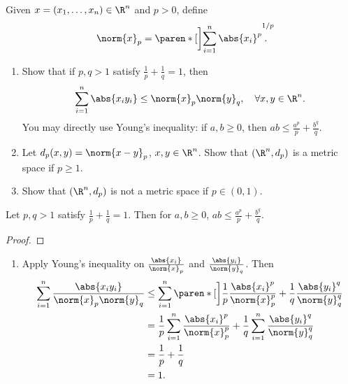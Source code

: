 \documentclass[12pt]{article}
\begin{document}
\begin{problem*}
    Given $x = (x_1, \dots, x_n) \in \R^n$ and $p > 0$, define \[
        \norm{x}_p = \paren*[\bigg]{\sum_{i=1}^{n} \abs{x_i}^p}^{1/p}
        \mkern-18mu.
    \]
    \begin{enumerate}[label=(\alph*)]
        \item Show that if $p, q > 1$ satisfy $\frac1p + \frac1q = 1$, then
        \[
            \sum_{i=1}^{n} \abs{x_i y_i} \le \norm{x}_p \norm{y}_q,
            \quad \forall x, y \in \R^n.
        \] You may directly use Young's inequality: if $a, b \ge 0$, then
        $ab \le \frac{a^p}{p} + \frac{b^q}{q}$.
        \item Let $d_p(x, y) = \norm{x - y}_p$, $x, y \in \R^n$.
        Show that $(\R^n, d_p)$ is a metric space if $p \ge 1$.
        \item Show that $(\R^n, d_p)$ is not a metric space if
        $p \in (0, 1)$.
    \end{enumerate}
\end{problem*}
\begin{lemma} \label{thm:young}
    Let $p, q > 1$ satisfy $\frac1p + \frac1q = 1$.
    Then for $a, b \ge 0$, $ab \le \frac{a^p}{p} + \frac{b^q}{q}$.
\end{lemma}
\begin{proof}
    
\end{proof}

\begin{solution} \leavevmode
    \begin{enumerate}[label=(\alph*)]
        \item Apply Young's inequality on $\frac{\abs{x_i}}{\norm{x}_p}$
        and $\frac{\abs{y_i}}{\norm{y}_q}$.
        Then \begin{align*}
            \sum_{i=1}^{n} \frac{\abs{x_i y_i}}{\norm{x}_p \norm{y}_q}
                &\le \sum_{i=1}^{n} \paren*[\bigg]{
                    \frac1p \frac{\abs{x_i}^p}{\norm{x}_p^p}
                    + \frac1q \frac{\abs{y_i}^q}{\norm{y}_q^q}
                } \\
                &= \frac1p \sum_{i=1}^{n} \frac{\abs{x_i}^p}{\norm{x}_p^p}
                + \frac1q \sum_{i=1}^{n} \frac{\abs{y_i}^q}{\norm{y}_q^q} \\
                &= \frac1p + \frac1q \\
                &= 1.
        \end{align*}
    \end{enumerate}
\end{solution}
\end{document}
